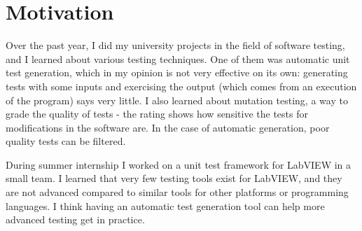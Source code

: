 \section{Motivation}
Over the past year, I did my university projects in the field of software testing, and I learned about various testing techniques. One of them was automatic unit test generation, which in my opinion is not very effective on its own: generating tests with some inputs and exercising the output (which comes from an execution of the program) says very little. I also learned about mutation testing, a way to grade the quality of tests - the rating shows how sensitive the tests for modifications in the software are. In the case of automatic generation, poor quality tests can be filtered.

During summer internship I worked on a unit test framework for LabVIEW in a small team. I learned that very few testing tools exist for LabVIEW, and they are not advanced compared to similar tools for other platforms or programming languages. I think having an automatic test generation tool can help more advanced testing get in practice.


\pagebreak
